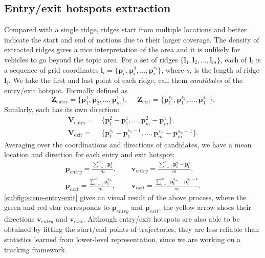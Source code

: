 \subsection{Entry/exit hotspots extraction}
\label{subsec:hdp-entry-exit}
Compared with a single ridge, ridges start from multiple locations and better indicate the start and end of motions due to their larger coverage.  The density of extracted ridges gives a nice interpretation of the area and it is unlikely for vehicles to go beyond the topic area. 
For a set of ridges $\{\bm{l}_1, \bm{l}_2, \dots, \bm{l}_m\}$, 
each of $\bm{l}_i$ is a sequence of grid coordinates $\bm{l}_i=\{\bm{p}_i^1, \bm{p}_i^2, \dots, \bm{p}_i^{s_i}\}$, 
where $s_i$ is the length of ridge $\bm{l}_i$. 
We take the first and last point of each ridge, call them \emph{candidates} of the entry/exit hotspot. Formally defined as 
$$\mathbf{Z}_\text{entry} = \{\bm{p}_1^1, \bm{p}_2^1, \dots, \bm{p}_m^1\},\; \quad
\mathbf{Z}_\text{exit} = \{\bm{p}_1^{s_1}, \bm{p}_1^{s_2}, \dots, \bm{p}_1^{s_m}\}.$$
Similarly, each has its own direction: 
\begin{align*}
\mathbf{V}_\text{entry} =& \{\bm{p}_1^2 -\bm{p}_1^1, \dots, \bm{p}_m^2-\bm{p}_m^1\},\\
\mathbf{V}_\text{exit} = &\{\bm{p}_1^{s_1}-\bm{p}_1^{s_1-1}, \dots, \bm{p}_{m}^{s_m}-\bm{p}_{m}^{s_m-1}\}.
\end{align*}
Averaging over the coordinations and directions of candidates, we have a mean location and direction for each entry and exit hotspot: 
\begin{align}
\bm{p}_{entry} = \frac{\sum_{i=1}^m{\bm{p_i^1}}}{m},\;\quad&\bm{v}_{entry} = \frac{\sum_{i=1}^m{\bm{p_i^2}-\bm{p_i^1}}}{m},\\
\bm{p}_{exit} = \frac{\sum_{i=1}^m{\bm{p_i^{s_m}}}}{m},\;\quad&\bm{v}_{exit} = \frac{\sum_{i=1}^m{\bm{p_i^{s_m}}-\bm{p_i^{s_m-1}}}}{m}.
\end{align}
\ref{subfig:scene-entry-exit} gives an visual result of the above process, 
where the green and red star corresponds to $\bm{p}_{entry}$ and $\bm{p}_{exit}$, the yellow arrow shoes their directions $\bm{v}_{entry}$ and $\bm{v}_{exit}$.
Although entry/exit hotspots are also able to be obtained by fitting the start/end points of trajectories, they are less reliable than statistics learned from lower-level representation, since we are working on a tracking framework.

